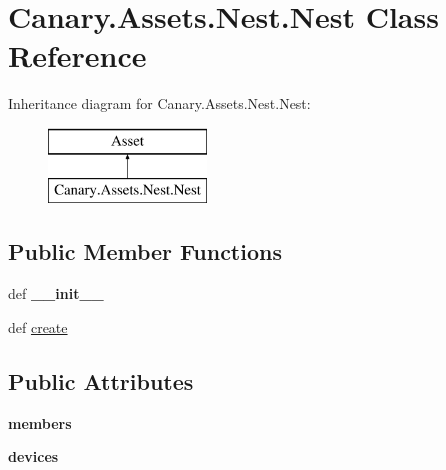 \hypertarget{class_canary_8_assets_1_1_nest_1_1_nest}{\section{Canary.\-Assets.\-Nest.\-Nest Class Reference}
\label{class_canary_8_assets_1_1_nest_1_1_nest}
}
Inheritance diagram for Canary.\-Assets.\-Nest.\-Nest\-:\begin{figure}[H]
\begin{center}
\leavevmode
\includegraphics[height=2.000000cm]{class_canary_8_assets_1_1_nest_1_1_nest}
\end{center}
\end{figure}
\subsection*{Public Member Functions}
\begin{DoxyCompactItemize}
\item 
\hypertarget{class_canary_8_assets_1_1_nest_1_1_nest_a58e7b3e0c63bc09dc57f4dcf8ee2fb47}{def {\bfseries \-\_\-\-\_\-init\-\_\-\-\_\-}}\label{class_canary_8_assets_1_1_nest_1_1_nest_a58e7b3e0c63bc09dc57f4dcf8ee2fb47}

\item 
def \hyperlink{class_canary_8_assets_1_1_nest_1_1_nest_a770193847e28ce2ea21faf318268102c}{create}
\end{DoxyCompactItemize}
\subsection*{Public Attributes}
\begin{DoxyCompactItemize}
\item 
\hypertarget{class_canary_8_assets_1_1_nest_1_1_nest_a89e4d8bb5b4da85fa00f4229db50ade3}{{\bfseries members}}\label{class_canary_8_assets_1_1_nest_1_1_nest_a89e4d8bb5b4da85fa00f4229db50ade3}

\item 
\hypertarget{class_canary_8_assets_1_1_nest_1_1_nest_afc1adebb85b2f61a5e36455d6e4be229}{{\bfseries devices}}\label{class_canary_8_assets_1_1_nest_1_1_nest_afc1adebb85b2f61a5e36455d6e4be229}

\end{DoxyCompactItemize}


